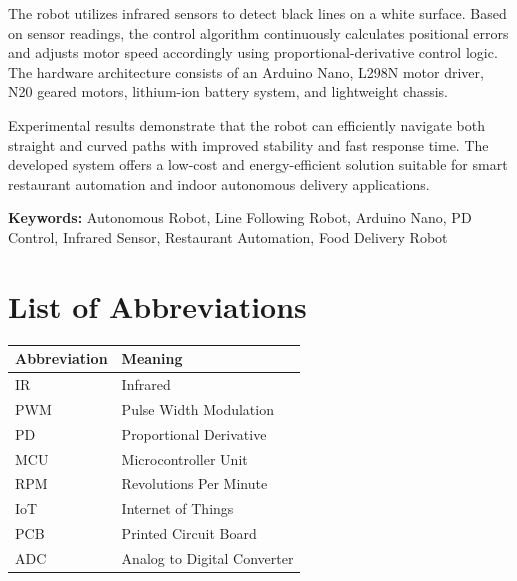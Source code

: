 \documentclass[12pt,a4paper,oneside]{report}
\begin{document}
The robot utilizes infrared sensors to detect black lines on a white surface. Based on sensor readings, the control algorithm continuously calculates positional errors and adjusts motor speed accordingly using proportional-derivative control logic. The hardware architecture consists of an Arduino Nano, L298N motor driver, N20 geared motors, lithium-ion battery system, and lightweight chassis.

Experimental results demonstrate that the robot can efficiently navigate both straight and curved paths with improved stability and fast response time. The developed system offers a low-cost and energy-efficient solution suitable for smart restaurant automation and indoor autonomous delivery applications.

\vspace{0.5cm}

\textbf{Keywords:}
Autonomous Robot,
Line Following Robot,
Arduino Nano,
PD Control,
Infrared Sensor,
Restaurant Automation,
Food Delivery Robot

\newpage


\tableofcontents

\newpage


\listoffigures

\newpage


\listoftables

\newpage


\chapter*{List of Abbreviations}

\begin{table}[H]
\centering
\begin{tabular}{ll}
\toprule
\textbf{Abbreviation} & \textbf{Meaning} \\
\midrule
IR & Infrared \\
PWM & Pulse Width Modulation \\
PD & Proportional Derivative \\
MCU & Microcontroller Unit \\
RPM & Revolutions Per Minute \\
IoT & Internet of Things \\
PCB & Printed Circuit Board \\
ADC & Analog to Digital Converter \\
\bottomrule
\end{tabular}
\end{table}
\end{document}
